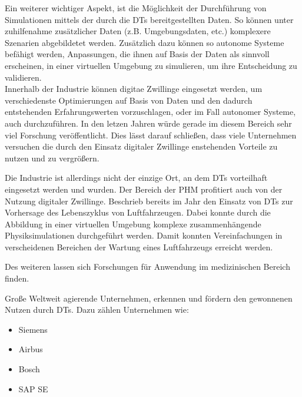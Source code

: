 Ein weiterer wichtiger Aspekt, ist die Möglichkeit der Durchführung von Simulationen mittels der durch die \ac{DT}s bereitgestellten Daten. So können unter zuhilfenahme zusätzlicher Daten (z.B. Umgebungsdaten, etc.) komplexere Szenarien abgebildetet werden. Zusätzlich dazu können so autonome Systeme befähigt werden, Anpassungen, die ihnen auf Basis der Daten als sinnvoll erscheinen, in einer virtuellen Umgebung zu simulieren, um ihre Entscheidung zu validieren. \autocite{rosen2015importance}\\
Innerhalb der Industrie können digitae Zwillinge eingesetzt werden, um verschiedenste Optimierungen auf Basis von Daten und den dadurch entstehenden Erfahrungswerten vorzuschlagen, oder im Fall autonomer Systeme, auch durchzuführen. In den letzen Jahren würde gerade im diesem Bereich sehr viel Forschung veröffentlicht. \autocite[S. 167657]{barricelli2019survey} Dies lässt darauf schließen, dass viele Unternehmen versuchen die durch den Einsatz digitaler Zwillinge enstehenden Vorteile zu nutzen und zu vergrößern. 

Die Industrie ist allerdings nicht der einzige Ort, an dem \ac{DT}s vorteilhaft eingesetzt werden und wurden. Der Bereich der \ac{PHM} profitiert auch von der Nutzung digitaler Zwillinge. \citeauthor{tuegel2011reengineering} Beschrieb bereits im Jahr \citeyear{tuegel2011reengineering} den Einsatz von \ac{DT}s zur Vorhersage des Lebenszyklus von Luftfahrzeugen. Dabei konnte durch die Abbildung in einer virtuellen Umgebung komplexe zusammenhängende Physiksimulationen durchgeführt werden. Damit konnten Vereinfachungen in verscheidenen Bereichen der Wartung eines Luftfahrzeugs erreicht werden.\autocites{tao2018digital}{tuegel2011reengineering}

Des weiteren lassen sich Forschungen für Anwendung im medizinischen Bereich finden. \autocites{barricelli2019survey}{tao2018digital}

Große Weltweit agierende Unternehmen, erkennen und fördern den gewonnenen Nutzen durch \ac{DT}s. Dazu zählen Unternehmen wie:
\begin{itemize}
    \item Siemens
    \item Airbus
    \item Bosch
    \item SAP SE
\end{itemize}

